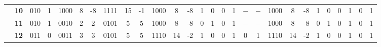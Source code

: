 \begin{figure}[H]
\begin{tcolorbox}[left=5mm,right=5mm,top=0mm,bottom=5mm,boxsep=0mm,
toptitle=0.5mm,bottomtitle=0.5mm,title=Resultados Teóricos \textit{versus} Resultados Experimentais,center title]
\begin{minipage}{\textwidth}
{\begin{tabular}{c|c|c|c|c|c|c|c|c|c|c|c|c|c|c|c|c|c|c|c|c|c|c|c|c|c|c|c|}
\cline{2-28}
                                                                                                           & \textbf{10}          & 010                  & 1                    & 1000                 & 8                                           & -8                                          & 1111                 & 15                                          & -1                                          & 1000                 & 8                                           & -8                                          & 1                    & 0                    & 0                    & 1                    & $-$                    & $-$                    & 1000                 & 8                                           & -8                                          & 1                    & 0                    & 0                    & 1                    & 0                    & 1                     \\ 
\cline{2-28}
                                                                                                           & \textbf{11}          & 010                  & 1                    & 0010                 & 2                                           & 2                                           & 0101                 & 5                                           & 5                                           & 1000                 & 8                                           & -8                                          & 0                    & 1                    & 0                    & 1                    & $-$                    & $-$                    & 1000                 & 8                                           & -8                                          & 0                    & 1                    & 0                    & 1                    & 0                    & 1                     \\ 
\cline{2-28}
                                                                                                           & \textbf{12}          & 011                  & 0                    & 0011                 & 3                                           & 3                                           & 0101                 & 5                                           & 5                                           & 1110                 & 14                                          & -2                                          & 1                    & 0                    & 0                    & 1                    & 0                    & 1                    & 1110                 & 14                                          & -2                                          & 1                    & 0                    & 0                    & 1                    & 0                    & 1                     \\ 

\end{tabular}}
\end{minipage}
\end{tcolorbox}
\end{figure}
